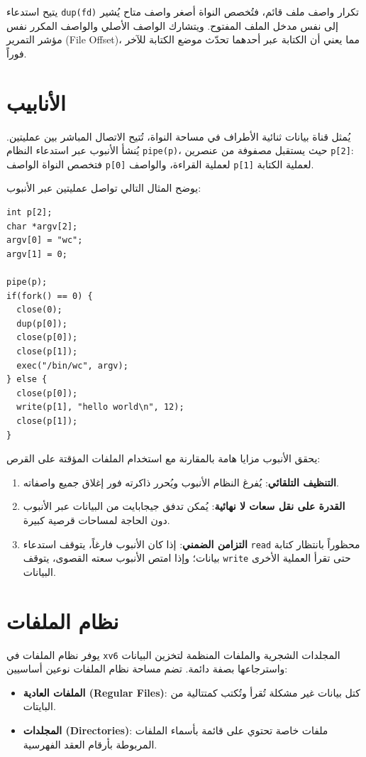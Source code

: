 يتيح استدعاء \texttt{dup(fd)} تكرار واصف ملف قائم، فتُخصص النواة أصغر واصف متاح يُشير إلى نفس مدخل الملف المفتوح.
ويتشارك الواصف الأصلي والواصف المكرر نفس مؤشر التمرير (File Offset)، مما يعني أن الكتابة عبر أحدهما تحدّث موضع الكتابة للآخر فوراً.

\section{الأنابيب}

يُمثل  قناة بيانات ثنائية الأطراف في مساحة النواة، تُتيح الاتصال المباشر بين عمليتين.
يُنشأ الأنبوب عبر استدعاء النظام \texttt{pipe(p)}، حيث يستقبل مصفوفة من عنصرين \texttt{p[2]}:
فتخصص النواة الواصف \texttt{p[0]} لعملية القراءة، والواصف \texttt{p[1]} لعملية الكتابة.

يوضح المثال التالي تواصل عمليتين عبر الأنبوب:

\begin{lstlisting}
int p[2];
char *argv[2];
argv[0] = "wc";
argv[1] = 0;

pipe(p);
if(fork() == 0) {
  close(0);
  dup(p[0]);
  close(p[0]);
  close(p[1]);
  exec("/bin/wc", argv);
} else {
  close(p[0]);
  write(p[1], "hello world\n", 12);
  close(p[1]);
}
\end{lstlisting}

يحقق الأنبوب مزايا هامة بالمقارنة مع استخدام الملفات المؤقتة على القرص:
\begin{enumerate}
\item \textbf{التنظيف التلقائي}: يُفرغ النظام الأنبوب ويُحرر ذاكرته فور إغلاق جميع واصفاته.
\item \textbf{القدرة على نقل سعات لا نهائية}: يُمكن تدفق جيجابايت من البيانات عبر الأنبوب دون الحاجة لمساحات قرصية كبيرة.
\item \textbf{التزامن الضمني}: إذا كان الأنبوب فارغاً، يتوقف استدعاء \texttt{read} محظوراً بانتظار كتابة بيانات؛ وإذا امتص الأنبوب سعته القصوى، يتوقف \texttt{write} حتى تقرأ العملية الأخرى البيانات.
\end{enumerate}

\section{نظام الملفات}

يوفر نظام الملفات في \texttt{xv6} المجلدات الشجرية والملفات المنظمة لتخزين البيانات واسترجاعها بصفة دائمة.
تضم مساحة نظام الملفات نوعين أساسيين:
\begin{itemize}
\item \textbf{الملفات العادية (Regular Files)}: كتل بيانات غير مشكلة تُقرأ وتُكتب كمتتالية من البايتات.
\item \textbf{المجلدات (Directories)}: ملفات خاصة تحتوي على قائمة بأسماء الملفات المربوطة بأرقام العقد الفهرسية.
\end{itemize}


